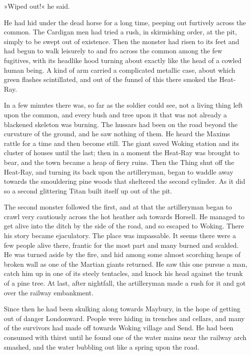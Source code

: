 »Wiped out!« he said.

He had hid under the dead horse for a long time, peeping out furtively across the common. The Cardigan men had tried a rush, in skirmishing order, at the pit, simply to be swept out of existence. Then the monster had risen to its feet and had begun to walk leisurely to and fro across the common among the few fugitives, with its headlike hood turning about exactly like the head of a cowled human being. A kind of arm carried a complicated metallic case, about which green flashes scintillated, and out of the funnel of this there smoked the Heat-Ray.

In a few minutes there was, so far as the soldier could see, not a living thing left upon the common, and every bush and tree upon it that was not already a blackened skeleton was burning. The hussars had been on the road beyond the curvature of the ground, and he saw nothing of them. He heard the Maxims rattle for a time and then become still. The giant saved Woking station and its cluster of houses until the last; then in a moment the Heat-Ray was brought to bear, and the town became a heap of fiery ruins. Then the Thing shut off the Heat-Ray, and turning its back upon the artilleryman, began to waddle away towards the smouldering pine woods that sheltered the second cylinder. As it did so a second glittering Titan built itself up out of the pit.

The second monster followed the first, and at that the artilleryman began to crawl very cautiously across the hot heather ash towards Horsell. He managed to get alive into the ditch by the side of the road, and so escaped to Woking. There his story became ejaculatory. The place was impassable. It seems there were a few people alive there, frantic for the most part and many burned and scalded. He was turned aside by the fire, and hid among some almost scorching heaps of broken wall as one of the Martian giants returned. He saw this one pursue a man, catch him up in one of its steely tentacles, and knock his head against the trunk of a pine tree. At last, after nightfall, the artilleryman made a rush for it and got over the railway embankment.

Since then he had been skulking along towards Maybury, in the hope of getting out of danger Londonward. People were hiding in trenches and cellars, and many of the survivors had made off towards Woking village and Send. He had been consumed with thirst until he found one of the water mains near the railway arch smashed, and the water bubbling out like a spring upon the road.

